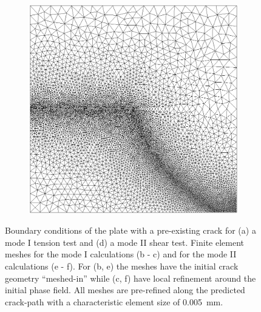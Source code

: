 \begin{figure}[htb!]
\begin{subfigure}[b]{0.19\textwidth}
    \caption{}
    \label{fig: Chapter4/mode2_notch_mesh}
  \end{subfigure}
  \hspace{0.05\textwidth}
  \begin{subfigure}[b]{0.19\textwidth}
    \centering
    \includegraphics[width=\textwidth]{Chapter4/figures/mode2_initial_mesh.png}
    \caption{}
    \label{fig: Chapter4/mode2_initial_mesh}
  \end{subfigure}
  \caption{Boundary conditions of the plate with a pre-existing crack for (a) a mode I tension test and (d) a mode II shear test. Finite element meshes for the mode I calculations (b - c) and for the mode II calculations (e - f). For (b, e) the meshes have the initial crack geometry ``meshed-in'' while (c, f) have local refinement around the initial phase field. All meshes are pre-refined along the predicted crack-path with a characteristic element size of \SI{0.005}{\milli\meter}.}
  \label{fig: example/bcs}
\end{figure}
